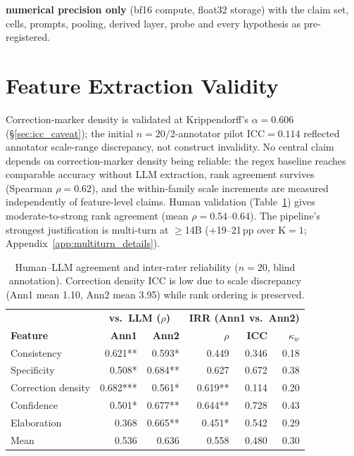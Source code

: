 \textbf{numerical precision only} (bf16 compute, float32 storage) with the claim set, cells, prompts, pooling, derived layer, probe and every hypothesis as pre-registered.

\section{Feature Extraction Validity}\label{app:feature_validity}

Correction-marker density is validated at Krippendorff's $\alpha=0.606$ (§\ref{sec:icc_caveat}); the initial $n=20$/2-annotator pilot ICC$=0.114$ reflected annotator scale-range discrepancy, not construct invalidity. No central claim depends on correction-marker density being reliable: the regex baseline reaches comparable accuracy without LLM extraction, rank agreement survives (Spearman $\rho=0.62$), and the within-family scale increments are measured independently of feature-level claims. Human validation (Table~\ref{tab:human_llm_agreement}) gives moderate-to-strong rank agreement (mean $\rho = 0.54$--$0.64$). The pipeline's strongest justification is multi-turn at $\geq$14B ($+$19--21\,pp over K$=1$; Appendix~\ref{app:multiturn_details}).

\begin{table}[h]
\centering
\caption{Human--LLM agreement and inter-rater reliability ($n=20$, blind annotation). Correction density ICC is low due to scale discrepancy (Ann1 mean 1.10, Ann2 mean 3.95) while rank ordering is preserved.}
\label{tab:human_llm_agreement}
\begin{tabular}{lrr|rrr}
\toprule
 & \multicolumn{2}{c|}{\textbf{vs.\ LLM ($\rho$)}} & \multicolumn{3}{c}{\textbf{IRR (Ann1 vs.\ Ann2)}} \\
\textbf{Feature} & \textbf{Ann1} & \textbf{Ann2} & \textbf{$\rho$} & \textbf{ICC} & \textbf{$\kappa_w$} \\
\midrule
Consistency   & 0.621** & 0.593*  & 0.449  & 0.346 & 0.18 \\
Specificity   & 0.508*  & 0.684** & 0.627  & 0.672 & 0.38 \\
Correction density & 0.682***& 0.561*  & 0.619**& 0.114 & 0.20 \\
Confidence    & 0.501*  & 0.677** & 0.644**& 0.728 & 0.43 \\
Elaboration   & 0.368   & 0.665** & 0.451* & 0.542 & 0.29 \\
\midrule
Mean          & 0.536   & 0.636   & 0.558  & 0.480 & 0.30 \\
\bottomrule
\end{tabular}
\end{table}

